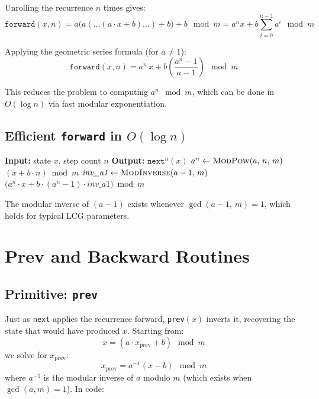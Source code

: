 \documentclass[11pt]{article}
\theoremstyle{plain}
\theoremstyle{definition}
\begin{document}
Unrolling the recurrence $n$ times gives:
\[
    \texttt{forward}(x, n)
    = a\bigl(a(\ldots(a \cdot x + b)\ldots) + b\bigr) + b \mod m
    = a^n x + b\sum_{i=0}^{n-1} a^i \mod m
\]

Applying the geometric series formula (for $a \neq 1$):
\[
    \texttt{forward}(x, n) = a^n\, x + b\!\left(\frac{a^n - 1}{a - 1}\right) \mod m
\]

This reduces the problem to computing $a^n \mod m$, which can be done in $O(\log n)$ via
fast modular exponentiation.

\subsection{Efficient \texttt{forward} in $O(\log n)$}

\begin{algorithm}[H]
\caption{\texttt{forward}$(x, n)$, efficient $O(\log n)$}
\begin{algorithmic}[1]
    \State \textbf{Input:} state $x$, step count $n$
    \State \textbf{Output:} $\texttt{next}^n(x)$
    \State $a^n \gets \textsc{ModPow}(a,\, n,\, m)$
        \State \Return $(x + b \cdot n) \bmod m$
    \EndIf
    \State $\textit{inv\_a1} \gets \textsc{ModInverse}(a - 1,\, m)$
    \State \Return $\bigl(a^n \cdot x + b \cdot (a^n - 1) \cdot \textit{inv\_a1}\bigr) \bmod m$
\end{algorithmic}
\end{algorithm}

\noindent The modular inverse of $(a-1)$ exists whenever $\gcd(a-1,\, m) = 1$, which holds for
typical LCG parameters.

\section{Prev and Backward Routines}

\subsection{Primitive: \texttt{prev}}

Just as \texttt{next} applies the recurrence forward, \texttt{prev}$(x)$ inverts it, recovering
the state that would have produced $x$. Starting from:
\[
    x = (a \cdot x_{\text{prev}} + b) \mod m
\]
we solve for $x_{\text{prev}}$:
\[
    x_{\text{prev}} = a^{-1}(x - b) \mod m
\]
where $a^{-1}$ is the modular inverse of $a$ modulo $m$ (which exists when $\gcd(a, m) = 1$).
In code:
\end{document}
